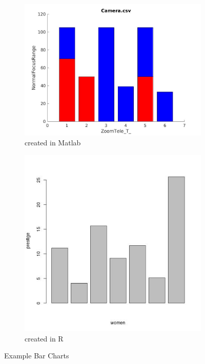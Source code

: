 \documentclass[12pt, a4paper,oneside]{report}
\begin{document}
\begin{figure}
	\begin{subfigure}{.5\textwidth}
		\centering
		\includegraphics[width=.8\linewidth]{bar1}
		\caption{created in Matlab}
		\label{fig:sfig1}
	\end{subfigure}%
	\begin{subfigure}{.5\textwidth}
		\centering
		\includegraphics[width=.8\linewidth]{bar2}
		\caption{created in R}
		\label{fig:sfig2}
	\end{subfigure}
	\caption{Example Bar Charts}
	\label{fig:fig}
\end{figure}
\end{document}
